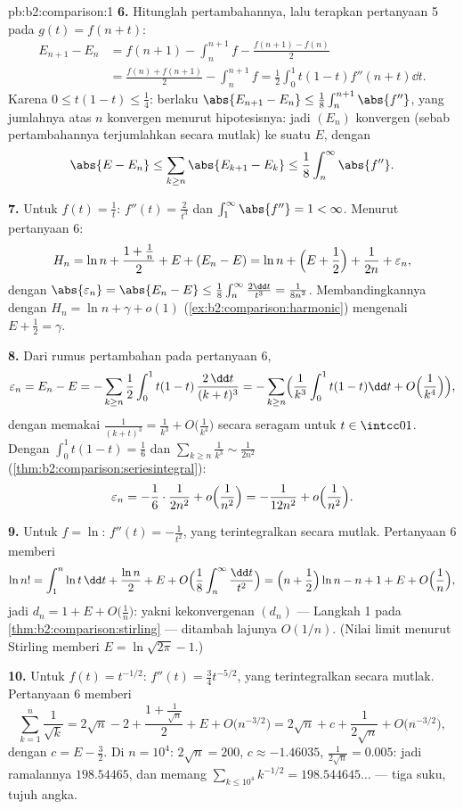 \begin{solution}{pb:b2:comparison:1}
\textbf{6.} Hitunglah pertambahannya, lalu terapkan pertanyaan 5 pada
$g(t) = f(n + t)$:
\begin{align*}
E_{n+1} - E_n
&= f(n{+}1) - \int_n^{n+1}\!f - \frac{f(n{+}1) - f(n)}2 \\
&= \frac{f(n) + f(n{+}1)}2 - \int_n^{n+1}\!f
= \frac12\int_0^1 t(1-t)f''(n+t)\dd t .
\end{align*}
Karena $0 \leq t(1-t) \leq \frac14$: berlaku $\abs{E_{n+1} - E_n} \leq
\frac18\int_n^{n+1}\abs{f''}$, yang jumlahnya atas $n$ konvergen menurut
hipotesisnya: jadi $(E_n)$ konvergen (sebab pertambahannya terjumlahkan
secara mutlak) ke suatu $E$, dengan
\[
\abs{E - E_n} \leq \sum_{k\geq n}\abs{E_{k+1} - E_k} \leq
\frac18\int_n^\infty\abs{f''} .
\]

\textbf{7.} Untuk $f(t) = \frac1t$: $f''(t) = \frac2{t^3}$ dan
$\int_1^\infty\abs{f''} = 1 < \infty$. Menurut pertanyaan 6:
\[
H_n = \ln n + \frac{1 + \frac1n}{2} + E + (E_n - E)
= \ln n + \Bigl(E + \frac12\Bigr) + \frac1{2n} +
\varepsilon_n,
\]
dengan $\abs{\varepsilon_n} = \abs{E_n - E} \leq
\frac18\int_n^\infty\frac{2\dd t}{t^3} = \frac1{8n^2}$.
Membandingkannya dengan $H_n = \ln n + \gamma + o(1)$
(\cref{ex:b2:comparison:harmonic}) mengenali $E + \frac12 =
\gamma$.

\textbf{8.} Dari rumus pertambahan pada pertanyaan 6,
\[
\varepsilon_n = E_n - E = -\sum_{k\geq n}\frac12\int_0^1
t(1-t)\,\frac{2\,\dd t}{(k+t)^3}
= -\sum_{k \geq n}\Bigl(\frac1{k^3}\int_0^1t(1-t)\dd t +
O\Bigl(\frac1{k^4}\Bigr)\Bigr),
\]
dengan memakai $\frac{1}{(k+t)^3} = \frac1{k^3} +
O\bigl(\frac1{k^4}\bigr)$ secara seragam untuk $t \in \intcc01$. Dengan
$\int_0^1 t(1-t) = \frac16$ dan
$\sum_{k\geq n}\frac1{k^3} \sim \frac{1}{2n^2}$
(\cref{thm:b2:comparison:seriesintegral}):
\[
\varepsilon_n = -\frac16\cdot\frac{1}{2n^2} +
o\Bigl(\frac1{n^2}\Bigr) = -\frac{1}{12n^2} +
o\Bigl(\frac{1}{n^2}\Bigr).
\]

\textbf{9.} Untuk $f = \ln$: $f''(t) = -\frac1{t^2}$, yang
terintegralkan secara mutlak. Pertanyaan 6 memberi
\[
\ln n! = \int_1^n\ln t\,\dd t + \frac{\ln n}2 + E + O\Bigl(
\frac1{8}\int_n^\infty\frac{\dd t}{t^2}\Bigr)
= \Bigl(n + \frac12\Bigr)\ln n - n + 1 + E +
O\Bigl(\frac1n\Bigr),
\]
jadi $d_n = 1 + E + O\bigl(\frac1n\bigr)$: yakni kekonvergenan $(d_n)$
--- Langkah 1 pada \cref{thm:b2:comparison:stirling} --- ditambah
lajunya $O(1/n)$. (Nilai limit menurut Stirling memberi $E =
\ln\sqrt{2\pi} - 1$.)

\textbf{10.} Untuk $f(t) = t^{-1/2}$: $f''(t) = \frac34 t^{-5/2}$, yang
terintegralkan secara mutlak. Pertanyaan 6 memberi
\[
\sum_{k=1}^n \frac1{\sqrt k}
= 2\sqrt n - 2 + \frac{1 + \frac1{\sqrt n}}2 + E +
O\bigl(n^{-3/2}\bigr)
= 2\sqrt n + c + \frac{1}{2\sqrt n} +
O\bigl(n^{-3/2}\bigr),
\]
dengan $c = E - \frac32$. Di $n = 10^4$: $2\sqrt n = 200$, $c
\approx -1.46035$, $\frac1{2\sqrt n} = 0.005$: jadi ramalannya
$198.54465$, dan memang $\sum_{k\leq10^4}k^{-1/2} =
198.544645\dots$ --- tiga suku, tujuh angka.


\end{solution}
